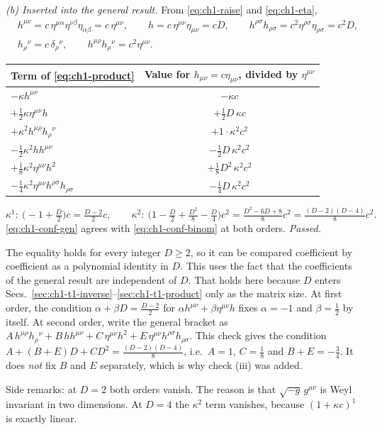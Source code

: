 \emph{(b) Inserted into the general result.} From \eqref{eq:ch1-raise} and
\eqref{eq:ch1-eta},
\begin{equation*}
\begin{aligned}
&h^{\mu\nu}=c\,\eta^{\mu\alpha}\eta^{\nu\beta}\eta_{\alpha\beta}=c\,\eta^{\mu\nu},\qquad h=c\,\eta^{\mu\nu}\eta_{\mu\nu}=cD,\qquad h^{\rho\sigma}h_{\rho\sigma}=c^2\eta^{\rho\sigma}\eta_{\rho\sigma}=c^2D,\\
&h_\rho{}^\nu=c\,\delta_\rho{}^\nu,\qquad h^{\mu\rho}h_\rho{}^\nu=c^2\eta^{\mu\nu}.
\end{aligned}
\end{equation*}
\begin{center}
\small
\begin{tabular}{lc}
\toprule
Term of \eqref{eq:ch1-product} & Value for $h_{\mu\nu}=c\eta_{\mu\nu}$, divided by $\eta^{\mu\nu}$\\
\midrule
$-\kappa h^{\mu\nu}$ & $-\kappa c$\\
$+\tfrac12\kappa\eta^{\mu\nu}h$ & $+\tfrac12D\,\kappa c$\\
$+\kappa^2h^{\mu\rho}h_\rho{}^\nu$ & $+1\cdot\kappa^2c^2$\\
$-\tfrac12\kappa^2hh^{\mu\nu}$ & $-\tfrac12D\,\kappa^2c^2$\\
$+\tfrac18\kappa^2\eta^{\mu\nu}h^2$ & $+\tfrac18D^2\,\kappa^2c^2$\\
$-\tfrac14\kappa^2\eta^{\mu\nu}h^{\rho\sigma}h_{\rho\sigma}$ & $-\tfrac14D\,\kappa^2c^2$\\
\bottomrule
\end{tabular}
\end{center}
\begin{equation}
\kappa^1:\ \big(-1+\tfrac D2\big)c=\tfrac{D-2}{2}c,\qquad
\kappa^2:\ \Big(1-\tfrac D2+\tfrac{D^2}8-\tfrac D4\Big)c^2=\tfrac{D^2-6D+8}{8}c^2=\tfrac{(D-2)(D-4)}{8}c^2 .
\label{eq:ch1-conf-gen}
\end{equation}
\eqref{eq:ch1-conf-gen} agrees with \eqref{eq:ch1-conf-binom} at both orders.
\emph{Passed.}

\begin{notebox}
The equality holds for every integer $D\ge2$, so it can be compared
coefficient by coefficient as a polynomial identity in $D$. This uses the fact
that the coefficients of the general result are independent of $D$. That
holds here because $D$ enters Secs.~\ref{sec:ch1-t1-inverse}--\ref{sec:ch1-t1-product}
only as the matrix size. At first order, the condition
$\alpha+\beta D=\tfrac{D-2}2$ for $\alpha h^{\mu\nu}+\beta\eta^{\mu\nu}h$ fixes
$\alpha=-1$ and $\beta=\tfrac12$ by itself. At second order, write the general
bracket as
$A\,h^{\mu\rho}h_\rho{}^\nu+B\,hh^{\mu\nu}+C\,\eta^{\mu\nu}h^2+E\,\eta^{\mu\nu}h^{\rho\sigma}h_{\rho\sigma}$.
This check gives the condition $A+(B+E)D+CD^2=\tfrac{(D-2)(D-4)}8$, i.e.\
$A=1$, $C=\tfrac18$ and $B+E=-\tfrac34$. It does \emph{not} fix $B$ and $E$
separately, which is why check (iii) was added.

Side remarks: at $D=2$ both orders vanish. The reason is that
$\sqrt{-g}\,g^{\mu\nu}$ is Weyl invariant in two dimensions. At $D=4$ the
$\kappa^2$ term vanishes, because $(1+\kappa c)^1$ is exactly linear.
\end{notebox}

